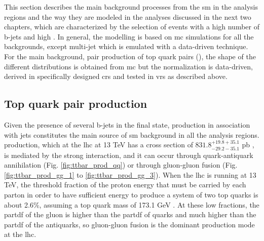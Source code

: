 This section describes the main background processes from the \gls{sm} in the analysis regions and the way they are 
modeled in the analyses discussed in the next two chapters, which are characterized by the selection of events with a high number of b-jets 
and high \met. 
In general, the modelling is based on \gls{mc} simulations for
all the backgrounds, except multi-jet which is emulated with a data-driven technique.
For the main background, pair production of top quark pairs (\ttbar), the shape of the different distributions is obtained from \gls{mc}
but the normalization is data-driven, derived in specifically designed \glspl{cr} and tested in \glspl{vr} as described above.


\subsection{Top quark pair production}

Given the presence of several b-jets in the final state, \ttbar production in association with jets constitutes the main source of \gls{sm} background in all the analysis regions. \ttbar production, which at the \gls{lhc} at 13 TeV has a cross section of $831.8^{+19.8 + 35.1}_{-29.2-35.1}$ pb \cite{Czakon:2013goa}, is mediated by the strong interaction, and it can occur through quark-antiquark annihilation (Fig. \ref{fig:ttbar_prod_qq}) or through gluon-gluon fusion (Fig. \ref{fig:ttbar_prod_gg_1} to \ref{fig:ttbar_prod_gg_3}). When the \gls{lhc} is running at 13 TeV, the threshold fraction of the proton energy that must be carried by each parton in order to have sufficient energy to produce a system of two top quarks 
is about 2.6\%, assuming a top quark mass of 173.1 GeV \cite{Patrignani:2016xqp}. 
At these low fractions, the \gls{partdf} of the gluon is higher than the \gls{partdf} of quarks and much higher than the \gls{partdf} of the antiquarks, so gluon-gluon fusion is the dominant \ttbar production mode at the \gls{lhc}.

